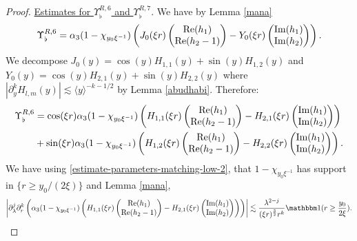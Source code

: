\documentclass[11 pt]{amsart}
\theoremstyle{definition}
\theoremstyle{remark}
\numberwithin{equation}{section}
\begin{document}
\begin{proof}
\noindent \underline{Estimates for $\Upsilon_\flat^{R,6}$ and $\Upsilon_\flat^{R,7}$}. We have by Lemma \ref{mana}
$$
\Upsilon^{R,6}_\flat =  \alpha_3 (1-\chi_{y_0 \xi^{-1}})\left( J_0(\xi r)\begin{pmatrix} \textup{Re}(h_1)  \\ \textup{Re}(h_2-1)  \end{pmatrix}-Y_0(\xi r)\begin{pmatrix} \textup{Im}(h_1)  \\ \textup{Im}(h_2)  \end{pmatrix}\right) .
$$
We decompose $J_0(y)= \cos (y) H_{1,1}(y)+ \sin (y) H_{1,2}(y)$ and $Y_0(y)= \cos (y) H_{2,1}(y)+ \sin (y) H_{2,2}(y)$ where $|\partial_y^k H_{l,m}(y)|\lesssim \langle y \rangle^{-k-1/2}$ by Lemma \ref{abudhabi}. Therefore:
\begin{align*}
\Upsilon^{R,6}_\flat & = \cos (\xi r)  \alpha_3 (1-\chi_{y_0 \xi^{-1}}) \left( H_{1,1}(\xi r)\begin{pmatrix} \textup{Re}(h_1)  \\ \textup{Re}(h_2-1)  \end{pmatrix}-H_{2,1}(\xi r)\begin{pmatrix} \textup{Im}(h_1)  \\ \textup{Im}(h_2)  \end{pmatrix}\right)\\
&+\sin (\xi r)  \alpha_3 (1-\chi_{y_0 \xi^{-1}}) \left( H_{1,2}(\xi r)\begin{pmatrix} \textup{Re}(h_1)  \\ \textup{Re}(h_2-1)  \end{pmatrix}-H_{2,2}(\xi r)\begin{pmatrix} \textup{Im}(h_1)  \\ \textup{Im}(h_2)  \end{pmatrix}\right)  .
\end{align*}
We have using \eqref{estimate-parameters-matching-low-2}, that $1-\chi_{y_0 \xi^{-1}}$ has support in $\{r\geq y_0/(2\xi)\}$ and Lemma \ref{mana},
$$
\left| \partial_\lambda^j\partial_r^k\left( \alpha_3 (1-\chi_{y_0 \xi^{-1}}) \left( H_{1,1}(\xi r)\begin{pmatrix} \textup{Re}(h_1)  \\ \textup{Re}(h_2-1)  \end{pmatrix}-H_{2,1}(\xi r)\begin{pmatrix} \textup{Im}(h_1)  \\ \textup{Im}(h_2)  \end{pmatrix}\right)\right) \right|\lesssim \frac{\lambda^{2-j}}{(\xi r)^{\frac 32}r^k}\mathbbm 1(r\geq \frac{y_0}{2\xi}).
$$
\end{proof}
\end{document}

